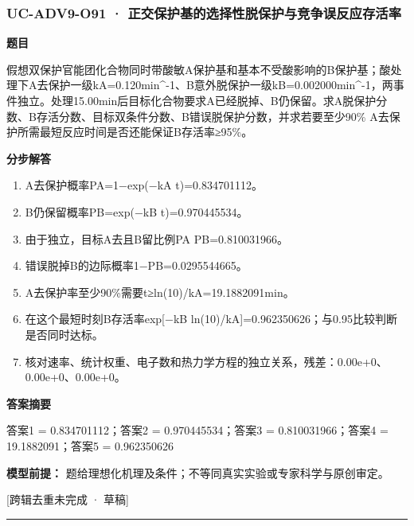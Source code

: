 \documentclass[UTF8,11pt,a4paper]{ctexart}
\begin{document}
\subsubsection*{UC-ADV9-O91 · 正交保护基的选择性脱保护与竞争误反应存活率}
\noindent\textbf{题目}\par
假想双保护官能团化合物同时带酸敏A保护基和基本不受酸影响的B保护基；酸处理下A去保护一级kA=0.120min\textasciicircum{}-1、B意外脱保护一级kB=0.002000min\textasciicircum{}-1，两事件独立。处理15.00min后目标化合物要求A已经脱掉、B仍保留。求A脱保护分数、B存活分数、目标双条件分数、B错误脱保护分数，并求若要至少90\% A去保护所需最短反应时间是否还能保证B存活率≥95\%。\par
\medskip\noindent\textbf{分步解答}
\begin{enumerate}
\item A去保护概率PA=1−exp(−kA t)=0.834701112。
\item B仍保留概率PB=exp(−kB t)=0.970445534。
\item 由于独立，目标A去且B留比例PA PB=0.810031966。
\item 错误脱掉B的边际概率1−PB=0.0295544665。
\item A去保护率至少90\%需要t≥ln(10)/kA=19.1882091min。
\item 在这个最短时刻B存活率exp[−kB ln(10)/kA]=0.962350626；与0.95比较判断是否同时达标。
\item 核对速率、统计权重、电子数和热力学方程的独立关系，残差：0.00e+0、0.00e+0、0.00e+0。
\end{enumerate}
\noindent\textbf{答案摘要}\par
答案1 = 0.834701112；答案2 = 0.970445534；答案3 = 0.810031966；答案4 = 19.1882091；答案5 = 0.962350626\par
\noindent\textbf{模型前提：}
题给理想化机理及条件；不等同真实实验或专家科学与原创审定。\par
\noindent\textcolor{red!65!black}{[跨辑去重未完成 · 草稿]} \par
\medskip\hrule\medskip
{}
\end{document}
